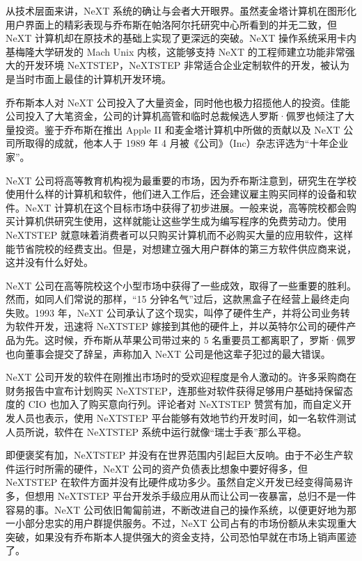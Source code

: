 \documentclass[12pt,UTF8]{ctexbook}
\begin{document}
从技术层面来讲，NeXT 系统的确让与会者大开眼界。虽然麦金塔计算机在图形化用户界面上的精彩表现与乔布斯在帕洛阿尔托研究中心所看到的并无二致，但 NeXT 计算机却在原技术的基础上实现了更深远的突破。NeXT 操作系统采用卡内基梅隆大学研发的 Mach Unix 内核，这能够支持 NeXT 的工程师建立功能非常强大的开发环境 NeXTSTEP，NeXTSTEP 非常适合企业定制软件的开发，被认为是当时市面上最佳的计算机开发环境。

乔布斯本人对 NeXT 公司投入了大量资金，同时他也极力招揽他人的投资。佳能公司投入了大笔资金，公司的计算机高管和临时总裁候选人罗斯·佩罗也倾注了大量投资。鉴于乔布斯在推出 Apple II 和麦金塔计算机中所做的贡献以及 NeXT 公司所取得的成就，他本人于 1989 年 4 月被《公司》（Inc）杂志评选为“十年企业家”。

NeXT 公司将高等教育机构视为最重要的市场，因为乔布斯注意到，研究生在学校使用什么样的计算机和软件，他们进入工作后，还会建议雇主购买同样的设备和软件。NeXT 计算机在这个目标市场中获得了初步进展。一般来说，高等院校都会购买计算机供研究生使用，这样就能让这些学生成为编写程序的免费劳动力。使用 NeXTSTEP 就意味着消费者可以只购买计算机而不必购买大量的应用软件，这样能节省院校的经费支出。但是，对想建立强大用户群体的第三方软件供应商来说，这并没有什么好处。

NeXT 公司在高等院校这个小型市场中获得了一些成效，取得了一些重要的胜利。然而，如同人们常说的那样，“15 分钟名气”过后，这款黑盒子在经营上最终走向失败。1993 年，NeXT 公司承认了这个现实，叫停了硬件生产，并将公司业务转为软件开发，迅速将 NeXTSTEP 嫁接到其他的硬件上，并以英特尔公司的硬件产品为先。这时候，乔布斯从苹果公司带过来的 5 名重要员工都离职了，罗斯·佩罗也向董事会提交了辞呈，声称加入 NeXT 公司是他这辈子犯过的最大错误。

NeXT 公司开发的软件在刚推出市场时的受欢迎程度是令人激动的。许多采购商在财务报告中宣布计划购买 NeXTSTEP，连那些对软件获得足够用户基础持保留态度的 CIO 也加入了购买意向行列。评论者对 NeXTSTEP 赞赏有加，而自定义开发人员也表示，使用 NeXTSTEP 平台能够有效地节约开发时间，如一名软件测试人员所说，软件在 NeXTSTEP 系统中运行就像“瑞士手表”那么平稳。

即便褒奖有加，NeXTSTEP 并没有在世界范围内引起巨大反响。由于不必生产软件运行时所需的硬件，NeXT 公司的资产负债表比想象中要好得多，但 NeXTSTEP 在软件方面并没有比硬件成功多少。虽然自定义开发已经变得简易许多，但想用 NeXTSTEP 平台开发杀手级应用从而让公司一夜暴富，总归不是一件容易的事。NeXT 公司依旧匍匐前进，不断改进自己的操作系统，以便更好地为那一小部分忠实的用户群提供服务。不过，NeXT 公司占有的市场份额从未实现重大突破，如果没有乔布斯本人提供强大的资金支持，公司恐怕早就在市场上销声匿迹了。
\end{document}
